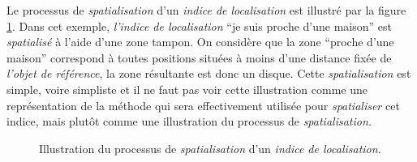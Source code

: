 Le processus de \emph{spatialisation} d'un \emph{indice de
  localisation} est illustré par la figure \ref{fig:obj_spa}. Dans cet
exemple, \emph{l'indice de localisation} \enquote{je suis proche d'une
  maison} est \emph{spatialisé} à l'aide d'une zone tampon. On
considère que la zone \enquote{proche d'une maison} correspond à
toutes positions situées à moins d'une distance fixée de \emph{l'objet
  de référence}, la zone résultante est donc un disque. Cette
\emph{spatialisation} est simple, voire simpliste et il ne faut pas
voir cette illustration comme une représentation de la méthode qui
sera effectivement utilisée pour \emph{spatialiser} cet indice, mais
plutôt comme une illustration du processus de \emph{spatialisation.}

\begin{figure}[hb]
  \centering
  
  \caption{Illustration du processus de \emph{spatialisation} d'un
    \emph{indice de localisation.}}
  \label{fig:obj_spa}
\end{figure}

